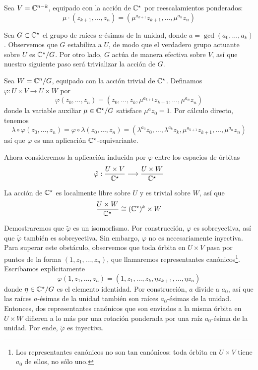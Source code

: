 \begin{solution}
\begin{enumerate}[label=\alph*)]
    Sea $V = \mathbb C^{n-k}$, equipado con la acción de $\mathbb C^\star$ por reescalamientos ponderados:
    $$\mu \cdot (z_{k+1}, \dots, z_n) = (\mu^{a_{k+1}} z_{k+1}, \dots, \mu^{a_n} z_n)$$
    
    Sea $G \subset \mathbb C^\star$ el grupo de raíces $a$-ésimas de la unidad, donde $a = \gcd(a_0, \dots, a_k)$. Observemos que $G$ estabiliza a $U$, de modo que el verdadero grupo actuante sobre $U$ es $\mathbb C^\star / G$. Por otro lado, $G$ actúa de manera efectiva sobre $V$, así que nuestro siguiente paso será trivializar la acción de $G$.
    
    Sea $W = \mathbb C^n / G$, equipado con la acción trivial de $\mathbb C^\star$. Definamos $\varphi : U \times V \to U \times W$ por
    $$\varphi(z_0, \dots, z_n) = (z_0, \dots, z_k, \mu^{a_{k+1}} z_{k+1}, \dots, \mu^{a_n} z_n)$$
    donde la variable auxiliar $\mu \in \mathbb C^\star / G$ satisface $\mu^a z_0 = 1$. Por cálculo directo, tenemos
    $$\lambda \circ \varphi(z_0, \dots, z_n) = \varphi \circ \lambda(z_0, \dots, z_n) = (\lambda^{a_0} z_0, \dots, \lambda^{a_k} z_k, \mu^{a_{k+1}} z_{k+1}, \dots, \mu^{a_n} z_n)$$
    así que $\varphi$ es una aplicación $\mathbb C^\star$-equivariante.
    
    Ahora consideremos la aplicación inducida por $\varphi$ entre los espacios de órbitas
    $$\tilde \varphi : \frac {U \times V} {\mathbb C^\star} \longrightarrow \frac {U \times W} {\mathbb C^\star}$$
    
    La acción de $\mathbb C^\star$ es localmente libre sobre $U$ y es trivial sobre $W$, así que
    $$\frac {U \times W} {\mathbb C^\star} \cong (\mathbb C^\star)^k \times W$$
    
    Demostraremos que $\tilde \varphi$ es un isomorfismo. Por construcción, $\varphi$ es sobreyectiva, así que $\tilde \varphi$ también es sobreyectiva. Sin embargo, $\varphi$ no es necesariamente inyectiva. Para superar este obstáculo, observemos que toda órbita en $U \times V$ pasa por puntos de la forma $(1, z_1, \dots, z_n)$, que llamaremos representantes canónicos\footnote{Los representantes canónicos no son tan canónicos: toda órbita en $U \times V$ tiene $a_0$ de ellos, no sólo uno.}. Escribamos explícitamente
    $$\varphi(1, z_1, \dots, z_n) = (1, z_1, \dots, z_k, \eta z_{k+1}, \dots, \eta z_n)$$
    donde $\eta \in \mathbb C^\star / G$ es el elemento identidad. Por construcción, $a$ divide a $a_0$, así que las raíces $a$-ésimas de la unidad también son raíces $a_0$-ésimas de la unidad. Entonces, dos representantes canónicos que son enviados a la misma órbita en $U \times W$ difieren a lo más por una rotación ponderada por una raíz $a_0$-ésima de la unidad. Por ende, $\tilde \varphi$ es inyectiva.
    

\end{enumerate}
\end{solution}

